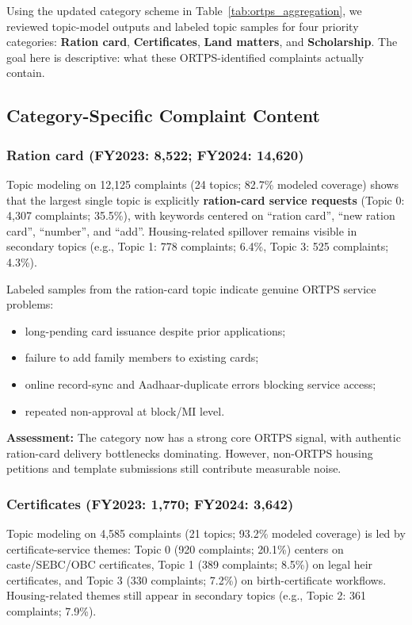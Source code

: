 \documentclass[11pt,a4paper]{article}
\begin{document}
Using the updated category scheme in Table~\ref{tab:ortps_aggregation}, we reviewed topic-model outputs and labeled topic samples for four priority categories: \textbf{Ration card}, \textbf{Certificates}, \textbf{Land matters}, and \textbf{Scholarship}. The goal here is descriptive: what these ORTPS-identified complaints actually contain.

\subsection{Category-Specific Complaint Content}

\subsubsection{Ration card (FY2023: 8,522; FY2024: 14,620)}

Topic modeling on 12,125 complaints (24 topics; 82.7\% modeled coverage) shows that the largest single topic is explicitly \textbf{ration-card service requests} (Topic 0: 4,307 complaints; 35.5\%), with keywords centered on ``ration card'', ``new ration card'', ``number'', and ``add''. Housing-related spillover remains visible in secondary topics (e.g., Topic 1: 778 complaints; 6.4\%, Topic 3: 525 complaints; 4.3\%).

Labeled samples from the ration-card topic indicate genuine ORTPS service problems:
\begin{itemize}
    \item long-pending card issuance despite prior applications;
    \item failure to add family members to existing cards;
    \item online record-sync and Aadhaar-duplicate errors blocking service access;
    \item repeated non-approval at block/MI level.
\end{itemize}

\textbf{Assessment:} The category now has a strong core ORTPS signal, with authentic ration-card delivery bottlenecks dominating. However, non-ORTPS housing petitions and template submissions still contribute measurable noise.

\subsubsection{Certificates (FY2023: 1,770; FY2024: 3,642)}

Topic modeling on 4,585 complaints (21 topics; 93.2\% modeled coverage) is led by certificate-service themes: Topic 0 (920 complaints; 20.1\%) centers on caste/SEBC/OBC certificates, Topic 1 (389 complaints; 8.5\%) on legal heir certificates, and Topic 3 (330 complaints; 7.2\%) on birth-certificate workflows. Housing-related themes still appear in secondary topics (e.g., Topic 2: 361 complaints; 7.9\%).
\end{document}
